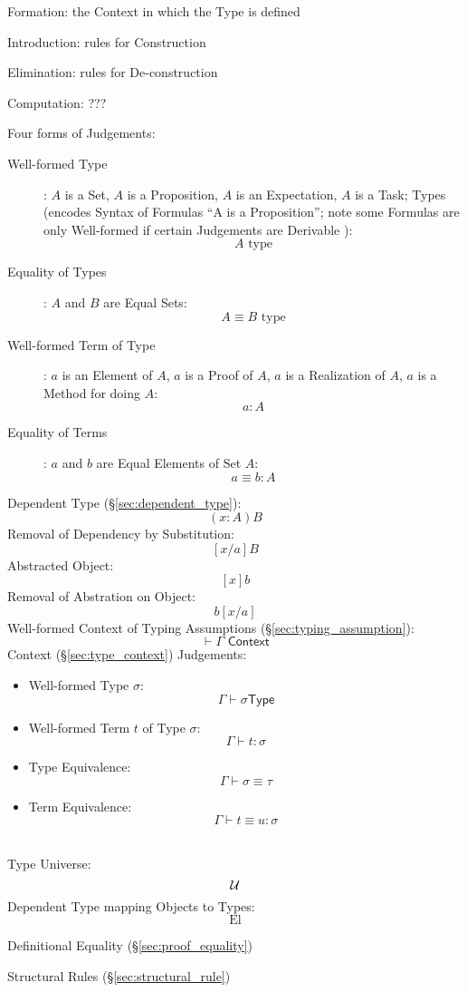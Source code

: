 Formation: the Context in which the Type is defined

Introduction: rules for Construction

Elimination: rules for De-construction

Computation: ???

Four forms of Judgements:
\begin{description}
  \item [Well-formed Type]: $A$ is a Set, $A$ is a Proposition, $A$ is
    an Expectation, $A$ is a Task; Types (encodes Syntax of Formulas
    ``A is a Proposition''; note some Formulas are only Well-formed if
    certain Judgements are Derivable \cite{thompson99}):
    \[
      A \text{ type}
    \]
  \item [Equality of Types]: $A$ and $B$ are Equal Sets:
    \[
      A \equiv B \text{ type}
    \]
  \item [Well-formed Term of Type]: $a$ is an Element of $A$, $a$ is a
    Proof of $A$, $a$ is a Realization of $A$, $a$ is a Method for
    doing $A$:
    \[
      a : A
    \]
  \item [Equality of Terms]: $a$ and $b$ are Equal Elements of Set $A$:
    \[
      a \equiv b : A
    \]
\end{description}

Dependent Type (\S\ref{sec:dependent_type}):
\[
  (x:A)B
\]
Removal of Dependency by Substitution:
\[
  [x/a]B
\]
Abstracted Object:
\[
  [x]b
\]
Removal of Abstration on Object:
\[
  b[x/a]
\]
Well-formed Context of Typing Assumptions
(\S\ref{sec:typing_assumption}):
\[
  \vdash \Gamma \textsf{ Context}
\]
Context (\S\ref{sec:type_context}) Judgements:
\begin {itemize}
\item Well-formed Type $\sigma$:
  \[
    \Gamma \vdash \sigma \mathsf{ Type}
  \]
\item Well-formed Term $t$ of Type $\sigma$:
  \[
    \Gamma \vdash t : \sigma
  \]
\item Type Equivalence:
  \[
    \Gamma \vdash \sigma \equiv \tau
  \]
\item Term Equivalence:
  \[
    \Gamma \vdash t \equiv u : \sigma
  \]
\end {itemize}
\hfill\\
Type Universe:
\[
  \mathcal{U}
\]
Dependent Type mapping Objects to Types:
\[
  \textrm{El}
\]

Definitional Equality (\S\ref{sec:proof_equality})

Structural Rules (\S\ref{sec:structural_rule})



